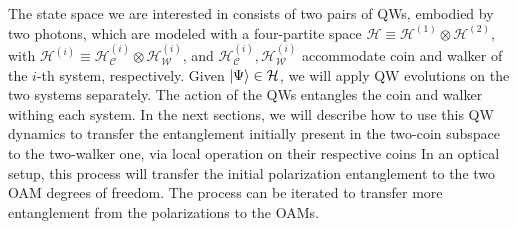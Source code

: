 \documentclass[
	aps, pra,
	superscriptaddress, twocolumn,
	floatfix,
	10pt
]{revtex4-1}
\newcommand{\parTitle}[1]{\noindent{\color{Mahogany}(\emph{#1})}}
\newcommand{\calC}{{\mathcal{C}}}
\newcommand{\calH}{{\mathcal{H}}}
\newcommand{\calU}{{\mathcal{U}}}
\newcommand{\calV}{{\mathcal{V}}}
\newcommand{\calW}{{\mathcal{W}}}
\newcommand{\HC}{\calH_{\calC}}
\newcommand{\HW}{\calH_{\calW}}
\begin{document}
\parTitle{Pairs of QWs}
The state space we are interested in consists of two pairs of QWs, embodied by two photons, which are modeled with a four-partite space $\calH\equiv \calH^{(1)}\otimes\calH^{(2)}$, with
$\calH^{(i)}\equiv \HC^{(i)}\otimes\HW^{(i)}$,
and $\HC^{(i)}, \HW^{(i)}$ accommodate coin and walker of the $i$-th system, respectively.
Given $\ket\Psi\in\calH$, we will apply QW evolutions on the two systems separately.
The action of the QWs entangles the coin and walker withing each system. In the next sections, we will describe how to use this QW dynamics to transfer the entanglement initially present in the two-coin subspace to the two-walker one, via local operation on their respective coins
In an optical setup, this process will transfer the initial polarization entanglement to the two OAM degrees of freedom. The process can be iterated to transfer more entanglement from the polarizations to the OAMs.

\end{document}
